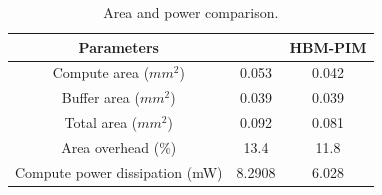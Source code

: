 \begingroup
\begin{table}[t]
  \small
  \caption{Area and power comparison.}
  \label{tab:area}
  \begin{center}
    \begin{tabular}{ccc}
      \toprule[1pt]
      \textbf{Parameters} & \textbf{\sysname{}} & \textbf{HBM-PIM} \\

      \midrule[1pt]
      Compute area ($mm^2$) & 0.053 & 0.042 \\
      \midrule
      Buffer area ($mm^2$) & 0.039 & 0.039 \\
      \midrule
      Total area ($mm^2$) & 0.092 & 0.081 \\
      \midrule
      Area overhead (\%) & 13.4 & 11.8 \\
      \midrule
      Compute power dissipation (mW) & 8.2908 & 6.028 \\
      \bottomrule[1pt]
    \end{tabular}
  \end{center}
\end{table}
\endgroup

